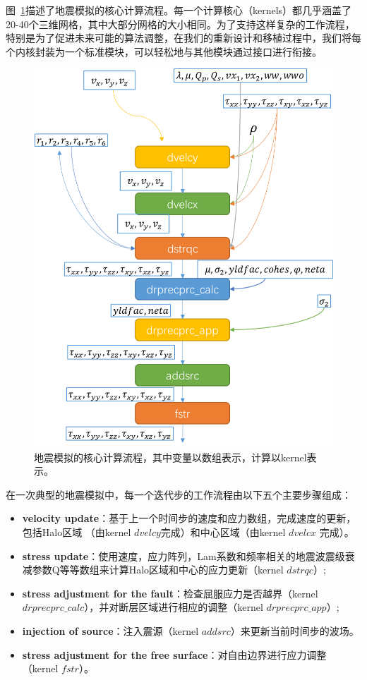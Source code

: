 \documentclass[degree=doctor]{thuthesis}
\begin{document}
图~\ref{fig:awp-workflow}描述了地震模拟的核心计算流程。每一个计算核心（kernels）都几乎涵盖了20-40个三维网格，其中大部分网格的大小相同。为了支持这样复杂的工作流程，特别是为了促进未来可能的算法调整，在我们的重新设计和移植过程中，我们将每个内核封装为一个标准模块，可以轻松地与其他模块通过接口进行衔接。

\begin{figure}[ht]
\centering
\includegraphics[width=0.8\columnwidth]{awp_chart.jpg}
\caption{地震模拟的核心计算流程，其中变量以数组表示，计算以kernel表示。}
\label{fig:awp-workflow}
\end{figure}

在一次典型的地震模拟中，每一个迭代步的工作流程由以下五个主要步骤组成：

\begin{itemize}
\item {\bf velocity update}：基于上一个时间步的速度和应力数组，完成速度的更新，包括Halo区域 （由kernel $dvelcy$完成）和中心区域（由kernel $dvelcx$ 完成）。

\item {\bf stress update}：使用速度，应力阵列，Lam系数和频率相关的地震波震级衰减参数Q等等数组来计算Halo区域和中心的应力更新（kernel $dstrqc$）;

\item {\bf stress adjustment for the fault}：检查屈服应力是否越界（kernel $drprecprc\_calc$），并对断层区域进行相应的调整（kernel $drprecprc\_app$）;

\item {\bf injection of source}：注入震源（kernel $addsrc$）来更新当前时间步的波场。

\item {\bf stress adjustment for the free surface}：对自由边界进行应力调整（kernel $fstr$）。
\end{itemize}
\end{document}
